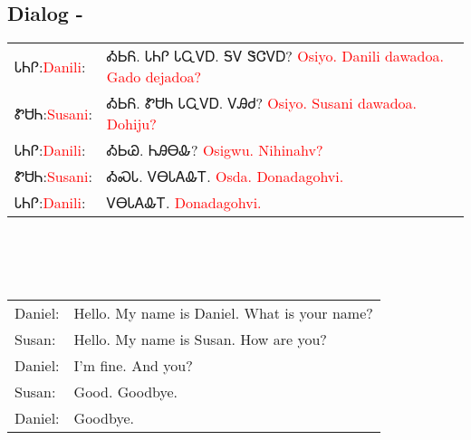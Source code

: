 \subsection{Dialog - }
\begin{tabular}{p{2cm} p{11cm}}
ᏓᏂᎵ:\newline \textcolor{red}{Danili}: & ᎣᏏᏲ.  ᏓᏂᎵ ᏓᏩᏙᎠ.  ᎦᏙ ᏕᏣᏙᎠ? 
\newline\textcolor{red}{Osiyo.  Danili dawadoa.  Gado dejadoa?}\\
ᏑᏌᏂ:\newline \textcolor{red}{Susani}: & ᎣᏏᏲ.  ᏑᏌᏂ ᏓᏩᏙᎠ.  ᏙᎯᏧ? 
\newline\textcolor{red}{Osiyo.  Susani dawadoa.  Dohiju?}\\
ᏓᏂᎵ:\newline \textcolor{red}{Danili}: & ᎣᏏᏊ.  ᏂᎯᎾᎲ? 
\newline\textcolor{red}{Osigwu.  Nihinahv?}\\
ᏑᏌᏂ:\newline \textcolor{red}{Susani}: & ᎣᏍᏓ.  ᏙᎾᏓᎪᎲᎢ. 
\newline\textcolor{red}{Osda.  Donadagohvi.}\\
ᏓᏂᎵ:\newline \textcolor{red}{Danili}: & ᏙᎾᏓᎪᎲᎢ. 
\newline\textcolor{red}{Donadagohvi.}\\
\end{tabular}
\\
\\
\\
\noindent\begin{tabular}{p{2cm} p{11cm}}Daniel: & Hello.  My name is Daniel.  What is your name?\\
Susan: & Hello.  My name is Susan.  How are you?\\
Daniel: & I'm fine.  And you?\\
Susan: & Good.  Goodbye.\\
Daniel: & Goodbye.\\
\end{tabular}
